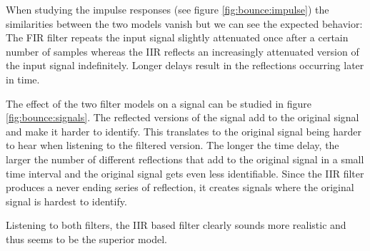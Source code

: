 \documentclass[journal]{IEEEtran}
\begin{document}
When studying the impulse responses (see figure \ref{fig:bounce:impulse}) the similarities between the two models vanish but we can see the expected behavior: The FIR filter repeats the input signal slightly attenuated once after a certain number of samples whereas the IIR reflects an increasingly attenuated version of the input signal indefinitely. Longer delays result in the reflections occurring later in time.

The effect of the two filter models on a signal can be studied in figure \ref{fig:bounce:signals}. The reflected versions of the signal add to the original signal and make it harder to identify. This translates to the original signal being harder to hear when listening to the filtered version. The longer the time delay, the larger the number of different reflections that add to the original signal in a small time interval and the original signal gets even less identifiable. Since the IIR filter produces a never ending series of reflection, it creates signals where the original signal is hardest to identify.

Listening to both filters, the IIR based filter clearly sounds more realistic and thus seems to be the superior model.
\end{document}
